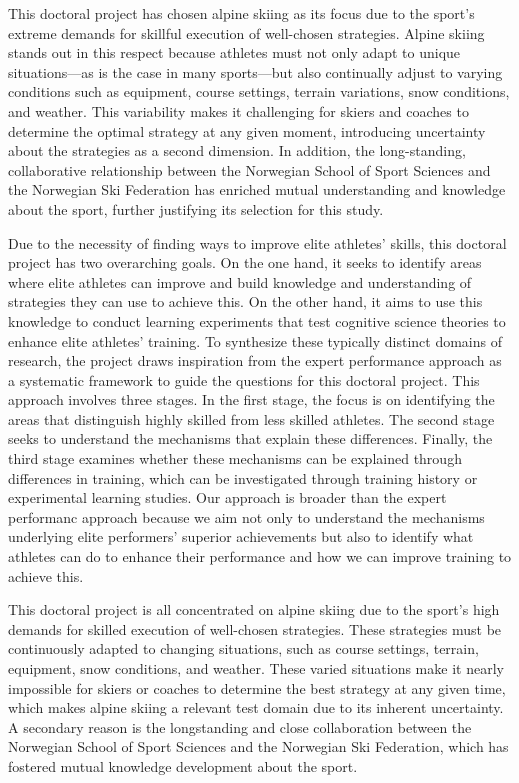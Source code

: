This doctoral project has chosen alpine skiing as its focus due to the sport's extreme demands for skillful execution of well-chosen strategies. Alpine skiing stands out in this respect because athletes must not only adapt to unique situations—as is the case in many sports—but also continually adjust to varying conditions such as equipment, course settings, terrain variations, snow conditions, and weather. This variability makes it challenging for skiers and coaches to determine the optimal strategy at any given moment, introducing uncertainty about the strategies as a second dimension. In addition, the long-standing, collaborative relationship between the Norwegian School of Sport Sciences and the Norwegian Ski Federation has enriched mutual understanding and knowledge about the sport, further justifying its selection for this study. 


Due to the necessity of finding ways to improve elite athletes' skills, this doctoral project has two overarching goals. On the one hand, it seeks to identify areas where elite athletes can improve and build knowledge and understanding of strategies they can use to achieve this. On the other hand, it aims to use this knowledge to conduct learning experiments that test cognitive science theories to enhance elite athletes' training. To synthesize these typically distinct domains of research, the project draws inspiration from the expert performance approach as a systematic framework to guide the questions for this doctoral project. This approach involves three stages. In the first stage, the focus is on identifying the areas that distinguish highly skilled from less skilled athletes. The second stage seeks to understand the mechanisms that explain these differences. Finally, the third stage examines whether these mechanisms can be explained through differences in training, which can be investigated through training history or experimental learning studies. Our approach is broader than the expert performanc approach because we aim not only to understand the mechanisms underlying elite performers' superior achievements but also to identify what athletes can do to enhance their performance and how we can improve training to achieve this. 

This doctoral project is all concentrated on alpine skiing due to the sport's high demands for skilled execution of well-chosen strategies. These strategies must be continuously adapted to changing situations, such as course settings, terrain, equipment, snow conditions, and weather. These varied situations make it nearly impossible for skiers or coaches to determine the best strategy at any given time, which makes alpine skiing a relevant test domain due to its inherent uncertainty. A secondary reason is the longstanding and close collaboration between the Norwegian School of Sport Sciences and the Norwegian Ski Federation, which has fostered mutual knowledge development about the sport.

